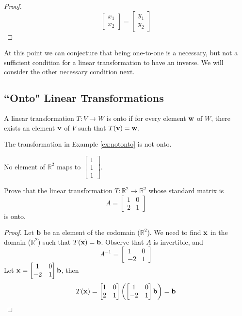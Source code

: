 \documentclass{ximera}
\renewcommand{\vec}[1]{{\bf #1}}
\newcommand{\RR}{\mathbb{R}}
\begin{document}
\begin{example}
\begin{proof}
$$\begin{bmatrix}x_1\\x_2\end{bmatrix}=\begin{bmatrix}y_1\\y_2\end{bmatrix}$$
\end{proof}
\end{example}

At this point we can conjecture that being one-to-one is a necessary, but not a sufficient condition for a linear transformation to have an inverse.  We will consider the other necessary condition next.

\subsection*{``Onto" Linear Transformations}

\begin{definition}[Onto]\label{def:onto} A linear transformation $T:V\rightarrow W$ is onto if for every element $\vec{w}$ of $W$, there exists an element $\vec{v}$ of $V$ such that $T(\vec{v})=\vec{w}$.
\end{definition}

\begin{example}
The transformation in Example \ref{ex:notonto} is not onto.
\begin{explanation}
No element of $\RR^2$ maps to $\begin{bmatrix}1\\1\\1\end{bmatrix}$.
\end{explanation}
\end{example}

\begin{example} Prove that the linear transformation $T:\RR^2\rightarrow \RR^2$ whose standard matrix is $$A=\begin{bmatrix}1&0\\2&1\end{bmatrix}$$ is onto.
\begin{proof} Let $\vec{b}$ be an element of the codomain ($\RR^2$).  We need to find $\vec{x}$ in the domain ($\RR^2$) such that $T(\vec{x})=\vec{b}$. 
Observe that $A$ is invertible, and $$A^{-1}=\begin{bmatrix}1&0\\-2&1\end{bmatrix}$$
 Let $\vec{x}=\begin{bmatrix}1&0\\-2&1\end{bmatrix}\vec{b}$, then 
 $$T(\vec{x})=\begin{bmatrix}1&0\\2&1\end{bmatrix}\left(\begin{bmatrix}1&0\\-2&1\end{bmatrix}\vec{b}\right)=\vec{b}$$
\end{proof}
\end{example}
\end{document}
